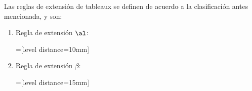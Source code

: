 \documentclass[11pt,letterpaper]{article}
\begin{document}
\begin{definicion}
 Las reglas de extensión de tableaux se definen de acuerdo a la
 clasificación antes mencionada, y son:
 \begin{enumerate}
 \item Regla de extensión $\al$: 
 \begin{center}
{}=[level distance=10mm]
\end{center}
 \item Regla de extensión $\beta$:%
 \begin{center}
{}=[level distance=15mm]
\end{center}


\end{enumerate}
\end{definicion}
\end{document}
